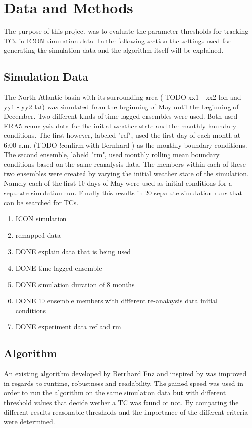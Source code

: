 \chapter{Data and Methods}\label{sec:methods}
The purpose of this project was to evaluate the parameter thresholds for tracking TCs in ICON simulation data. In the following section the settings used for generating the simulation data and the algorithm itself will be explained.
\section{Simulation Data}\label{sec:data}
The North Atlantic basin with its surrounding area ( TODO xx1 - xx2 lon and yy1 - yy2 lat) %
was simulated from the beginning of May until the beginning of December.
Two different kinds of time lagged ensembles were used. Both used ERA5 reanalysis data for the initial weather state and the monthly boundary conditions. The first however, labeled "ref", used the first day of each month at 6:00 a.m. (TODO !confirm with Bernhard ) %
as the monthly boundary conditions. The second ensemble, labeld "rm", used monthly rolling mean boundary conditions based on the same reanalysis data.
The members within each of these two ensembles were created by varying the initial weather state of the simulation. Namely each of the first 10 days of May were used as initial conditions for a separate simulation run. 
Finally this results in 20 separate simulation runs that can be searched for TCs.
\begin{enumerate}
    \item ICON simulation %
    \item remapped data %
    \item DONE explain data that is being used
    \item DONE time lagged ensemble
    \item DONE simulation duration of 8 months
    \item DONE 10 ensemble members with different re-analaysis data initial conditions
    \item DONE experiment data ref and rm
\end{enumerate}
\section{Algorithm}
An existing algorithm developed by Bernhard Enz and inspired by \cite{orig-tracking} was improved in regards to runtime, robustness and readability. The gained speed was used in order to run the algorithm on the same simulation data but with different threshold values that decide wether a TC was found or not. By comparing the different results reasonable thresholds and the importance of the different criteria were determined.
